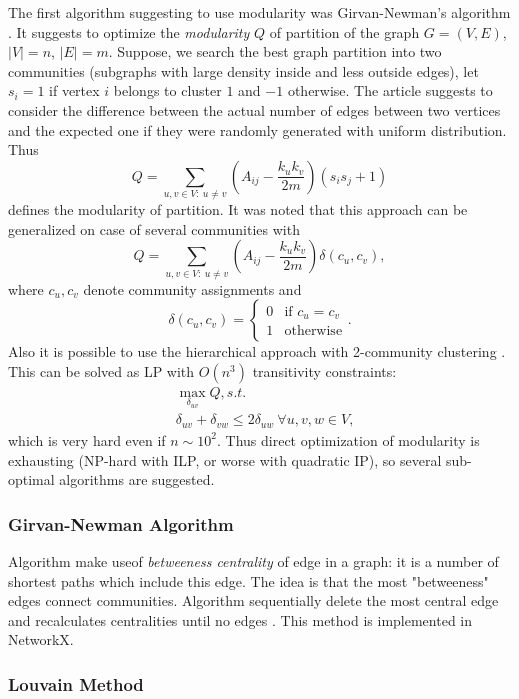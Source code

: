 \documentclass[a4paper]{article}
\begin{document}
The first algorithm suggesting to use modularity was Girvan-Newman's  algorithm \cite{Girvan:11062002}. It suggests to optimize the \textit{modularity} $Q$ of partition of the graph $G=(V,E)$, $\vert V \vert = n$, $\vert E \vert = m$. Suppose, we search the best graph partition into two communities (subgraphs with large density inside and less outside edges), let $s_i=1$ if vertex $i$ belongs to cluster $1$ and $-1$ otherwise. The article suggests to consider the difference between the actual number of edges between two vertices and the expected one if they were randomly generated with uniform distribution. Thus
$$
Q = \sum_{u,v \in V: ~u \neq v }\left( A_{ij}-\frac{k_uk_v}{2m}\right)\left(s_is_j+1\right) 
$$
defines the modularity of partition. It was noted that this approach can be generalized on case of several communities \cite{Newman:LargeNetworks} with
$$
Q=\sum_{u,v \in V: ~u \neq v }\left( A_{ij}-\frac{k_uk_v}{2m}\right)\delta(c_u,c_v), 
$$
where $c_u,c_v$ denote community assignments and
$$
\delta(c_u,c_v)=
  \begin{cases}
            0 & \text{if $c_u=c_v$} \\
            1 & \text{otherwise} 
  \end{cases}.
$$
Also it is possible to use the hierarchical approach with 2-community clustering \cite{Newman:Structure}. This can be solved as LP with $O(n^3)$ transitivity constraints:
\begin{align*}
& \max_{\delta_{uv}} Q, s.t.\\
& \delta_{uv} + \delta_{vw} \leq 2 \delta_{uw} ~ \forall u,v,w \in V,
\end{align*}
which is very hard even if $n \sim 10^2$. Thus direct optimization of modularity is exhausting (NP-hard with ILP, or worse with quadratic IP), so several sub-optimal algorithms are suggested.

\subsubsection*{Girvan-Newman Algorithm}

Algorithm make useof \textit{betweeness centrality} of edge in a graph: it is a number of shortest paths which include this edge. The idea is that the most "betweeness" edges connect communities. Algorithm sequentially delete the most central edge and recalculates centralities until no edges \cite{Girvan:11062002}. This method is implemented in NetworkX.

\subsubsection*{Louvain Method}
\end{document}
